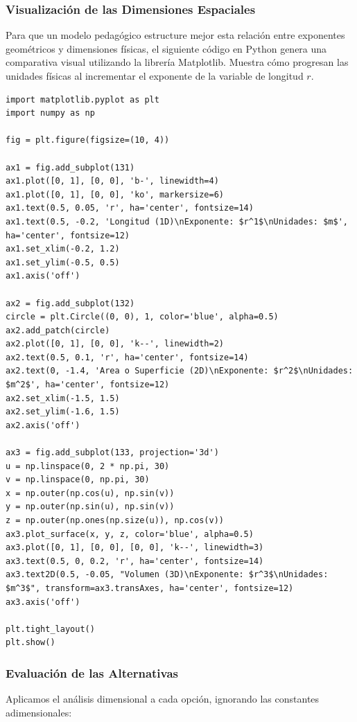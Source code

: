 \documentclass[12pt, a4paper]{article}
\begin{document}
\subsubsection*{Visualización de las Dimensiones Espaciales}

Para que un modelo pedagógico estructure mejor esta relación entre exponentes geométricos y dimensiones físicas, el siguiente código en Python genera una comparativa visual utilizando la librería Matplotlib. Muestra cómo progresan las unidades físicas al incrementar el exponente de la variable de longitud $r$.

\begin{lstlisting}
import matplotlib.pyplot as plt
import numpy as np

fig = plt.figure(figsize=(10, 4))

ax1 = fig.add_subplot(131)
ax1.plot([0, 1], [0, 0], 'b-', linewidth=4)
ax1.plot([0, 1], [0, 0], 'ko', markersize=6)
ax1.text(0.5, 0.05, 'r', ha='center', fontsize=14)
ax1.text(0.5, -0.2, 'Longitud (1D)\nExponente: $r^1$\nUnidades: $m$', ha='center', fontsize=12)
ax1.set_xlim(-0.2, 1.2)
ax1.set_ylim(-0.5, 0.5)
ax1.axis('off')

ax2 = fig.add_subplot(132)
circle = plt.Circle((0, 0), 1, color='blue', alpha=0.5)
ax2.add_patch(circle)
ax2.plot([0, 1], [0, 0], 'k--', linewidth=2)
ax2.text(0.5, 0.1, 'r', ha='center', fontsize=14)
ax2.text(0, -1.4, 'Area o Superficie (2D)\nExponente: $r^2$\nUnidades: $m^2$', ha='center', fontsize=12)
ax2.set_xlim(-1.5, 1.5)
ax2.set_ylim(-1.6, 1.5)
ax2.axis('off')

ax3 = fig.add_subplot(133, projection='3d')
u = np.linspace(0, 2 * np.pi, 30)
v = np.linspace(0, np.pi, 30)
x = np.outer(np.cos(u), np.sin(v))
y = np.outer(np.sin(u), np.sin(v))
z = np.outer(np.ones(np.size(u)), np.cos(v))
ax3.plot_surface(x, y, z, color='blue', alpha=0.5)
ax3.plot([0, 1], [0, 0], [0, 0], 'k--', linewidth=3)
ax3.text(0.5, 0, 0.2, 'r', ha='center', fontsize=14)
ax3.text2D(0.5, -0.05, "Volumen (3D)\nExponente: $r^3$\nUnidades: $m^3$", transform=ax3.transAxes, ha='center', fontsize=12)
ax3.axis('off')

plt.tight_layout()
plt.show()
\end{lstlisting}

\subsubsection*{Evaluación de las Alternativas}

Aplicamos el análisis dimensional a cada opción, ignorando las constantes adimensionales:
\end{document}
